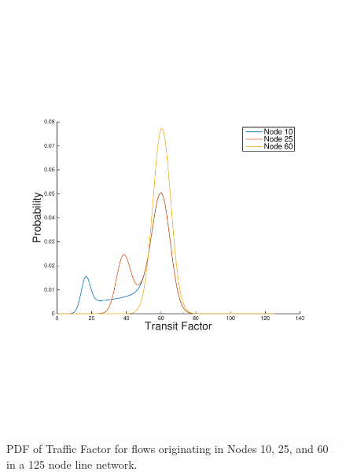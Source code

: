 \begin{figure}
\begin{centering}
    \includegraphics[scale=0.4, clip=true, trim=15mm 65mm 20mm 65mm]{figures/PDF_TF_line_net_125.pdf}
    \caption{PDF of Traffic Factor for flows originating in Nodes 10, 25, and 60 in a 125 node line network.}
    \label{fig:PDF_TF_line_net}
\end{centering}
\end{figure}

